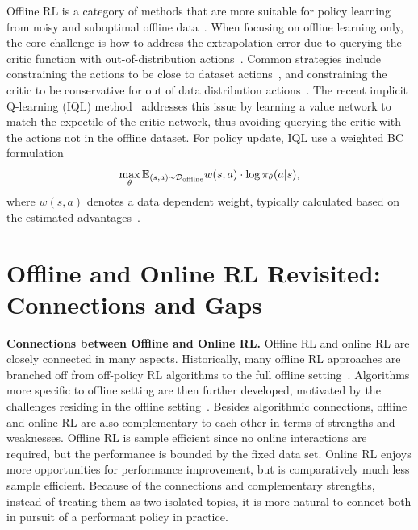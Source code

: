 \documentclass{article}
\begin{document}
Offline RL is a category of methods that are more suitable for policy learning from noisy and suboptimal offline data~\citep{kumar2022should}.
When focusing on offline learning only, the core challenge is how to address the extrapolation error due to
querying the critic function with out-of-distribution actions~\citep{BCQ, cql}.
Common strategies include constraining the actions to be close to dataset actions~\citep{BCQ, td3bc}, and constraining the critic to be conservative for out of data distribution actions~\citep{cql}.
The recent implicit Q-learning (IQL) method~\citep{iql} addresses this issue by learning a value network to match the expectile of the critic network,  thus avoiding querying the critic with the actions not in the offline dataset.
For policy update, IQL use a weighted BC formulation
\begin{equation} \label{eq:awac}
    \max_{\theta} \mathbb{E}_{(s, a)\sim \mathcal{D}_{\rm offline}}  w(s, a) \cdot \log \pi_{\theta}(a|s),
\end{equation}
where $w(s, a)$ denotes a data dependent weight, typically calculated based on the estimated advantages~\citep{AWAC, weighted_bc, iql}.

\section{Offline and Online RL Revisited: Connections and Gaps}

{\flushleft \textbf{Connections between Offline and Online RL.}}
Offline RL and online RL are closely connected in many aspects.
Historically, many offline RL approaches are branched off from off-policy RL algorithms to the full offline setting~\citep{BCQ, td3bc}.
Algorithms more specific to offline setting are then further developed, motivated by the challenges residing in the offline setting~\citep{offline_rl, cql}.
Besides algorithmic connections, offline and online RL are also complementary to each other
in terms of strengths and weaknesses.
Offline RL is sample efficient since
 no online interactions are required, but the performance is bounded by the fixed data set.
Online RL enjoys more opportunities for performance improvement, but is comparatively
much less sample efficient.
Because of the connections and complementary strengths, instead of treating
them as two isolated topics, it is more natural to connect both
in pursuit of a performant policy in practice.
\end{document}
